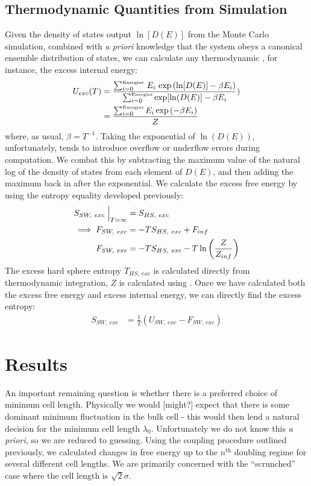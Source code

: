\documentclass[12pt]{article}
\newcommand{\ignore}[1]{}
\begin{document}
\subsection{Thermodynamic Quantities from Simulation}
Given the density of states output $\ln[D(E)]$ from the Monte Carlo simulation, combined with {\it a priori} knowledge that the system obeys a canonical ensemble distribution of states, we can calculate any thermodynamic , for instance, the excess internal energy:
\begin{align*}
     U_{exc}(T) &= \frac{\sum_{i=0}^{\text{\tiny Energies}}\,E_i\, \exp\left(\ln[D(E)] - \beta E_i\right)}{\sum_{i=0}^{\text{\tiny Energies}} \exp[\ln(D(E)] - \beta E_i})\\
     &= \frac{\sum_{i=0}^{\text{\tiny Energies}} E_i \exp\left(-\beta E_i\right)}{Z}
\end{align*} 
where, as usual, $\beta = T^{-1}$. Taking the exponential of $\ln(D(E))$, unfortunately, tends to introduce overflow or underflow errors during computation. We combat this by subtracting the maximum value of the natural log of the density of states \ignore{subtracting maximum ought to make it more negative\dots}from each element of $D(E)$, and then adding the maximum back in after the exponential. We calculate the excess free energy by using the entropy equality developed previously:
\begin{align*}
     S_{SW,~exc}\Bigm\lvert_{T=\infty} &= S_{HS,~exc}\\
     \implies F_{SW,~exc} &= -TS_{HS,~exc} + F_{inf}\\
     F_{SW,~exc} &= -TS_{HS,~exc} - T\ln\left(\frac{Z}{Z_{inf}}\right)
\end{align*} 
The excess hard sphere entropy $T_{HS,~exc}$ is calculated directly from thermodynamic integration, $Z$ is calculated using  . Once we have calculated both the excess free energy and excess internal energy, we can directly find the excess entropy:
\begin{align*}
    S_{SW, ~exc} &= \frac{1}{T}\left(U_{SW,~exc} - F_{SW,~exc} \right)
\end{align*}


\section{Results}
An important remaining question is whether there is a preferred choice of minimum cell length. Physically we would [might?] expect that there is some dominant minimum fluctuation in the bulk cell - this would then lend a natural decision for the minimum cell length $\lambda_0$. Unfortunately we do not know this {\it a priori}, so we are reduced to guessing. Using the coupling procedure outlined previously, we calculated changes in free energy up to the $n^{\text{th}}$ doubling regime for several different cell lengths. We are primarily concerned with the ``scrunched'' case where the cell length is $\sqrt2\sigma$.\\
\end{document}

